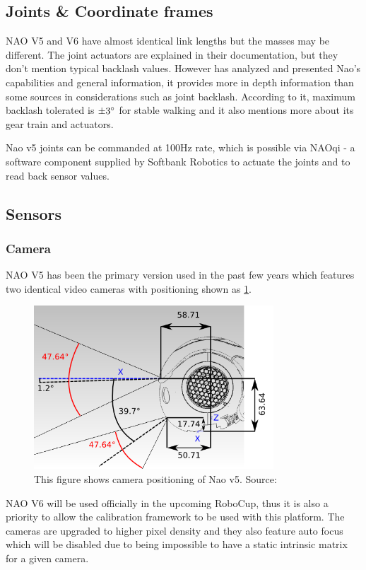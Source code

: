 \documentclass[english, printversion, nomenclature, notitle]{tuvisionthesis} %
\begin{document}
\subsection{Joints \& Coordinate frames}

NAO V5 and V6 have almost identical link lengths but the masses may be different. The joint actuators are explained in their documentation, but they don't mention typical backlash values. However \cite{gouaillier_nao_2008} has analyzed and presented Nao's capabilities and general information, it provides more in depth information than some sources in considerations such as joint backlash. According to it, maximum backlash tolerated is $\pm 3\degree$ for stable walking and it also mentions more about its gear train and actuators.

Nao v5 joints can be commanded at 100Hz rate, which is possible via NAOqi - a software component supplied by Softbank Robotics to actuate the joints and to read back sensor values.

\subsection{Sensors}
\subsubsection{Camera}
NAO V5 has been the primary version used in the past few years which features two identical video cameras with positioning shown as \cref{fig:naov5_cameras}.

\begin{figure}
	\begin{center}
		\includegraphics[width=0.8\textwidth]{nao_hardware_camera_lateral.png}
		\caption[Nao v5 camera positioning]{This figure shows camera positioning of Nao v5. Source: \cite{softbank_robotics_video_nodate}}
		\label{fig:naov5_cameras}
	\end{center}
\end{figure}
NAO V6 will be used officially in the upcoming RoboCup, thus it is also a priority to allow the calibration framework to be used with this platform. The cameras are upgraded to higher pixel density and they also feature auto focus which will be disabled due to being impossible to have a static intrinsic matrix for a given camera.
\end{document}
